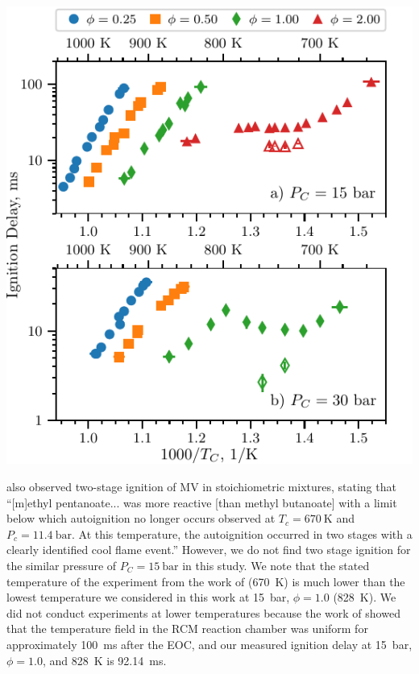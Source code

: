 \documentclass[letterpaper, review, sort&compress]{elsarticle}
\begin{document}
\begin{center}
    \captionsetup{type=figure}
    \includegraphics{figures/ignition-delays.pdf}
    \caption{Ignition delays of MV as a function of inverse temperature for varying equivalence
    ratios. Filled points are the overall ignition delays and hollow points are the first stage
    ignition delays. a) \SI{15}{\bar}, b) \SI{30}{\bar}.}
    \label{fig:ignition-delays}
\end{center}

\citet{Hadj-Ali2009} also observed two-stage ignition of MV in stoichiometric mixtures, stating that
``[m]ethyl pentanoate... was more reactive [than methyl butanoate] with a limit below which
autoignition no longer occurs observed at \(T_c = \SI{670}{\K}\) and \(P_c = \SI{11.4}{\bar}\). At
this temperature, the autoignition occurred in two stages with a clearly identified cool flame
event.'' However, we do not find two stage ignition for the similar pressure of
\(P_C = \SI{15}{\bar}\) in this study. We note that the stated temperature of the experiment from
the work of \citet{Hadj-Ali2009} (\SI{670}{\K}) is much lower than the lowest temperature we
considered in this work at \SI{15}{\bar}, \(\phi=1.0\) (\SI{828}{\K}). We did not conduct
experiments at lower temperatures because the work of \citet{Mittal2006} showed that the temperature
field in the RCM reaction chamber was uniform for approximately \SI{100}{\ms} after the EOC, and our
measured ignition delay at \SI{15}{\bar}, \(\phi=1.0\), and \SI{828}{\K} is \SI{92.14}{\ms}.
\end{document}
